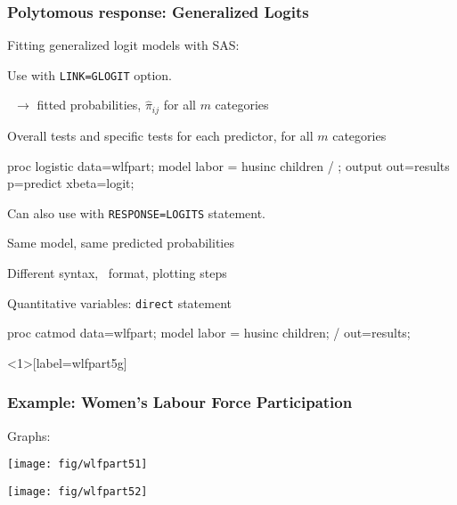 \begin{frame}[fragile]
  \frametitle{Polytomous response: Generalized Logits}
Fitting generalized logit models with SAS:
      \begin{itemize*}
	  \item Use  with \texttt{LINK=GLOGIT} option.
    	\begin{itemize*}
		\item \ODS\ $\rightarrow$ fitted probabilities, $\widehat{\pi}_{ij}$ for all $m$ categories
		\item Overall tests and specific tests for each predictor, for all $m$ categories
		\end{itemize*}
\vspace{2ex}
\begin{Input}[numbers=none]
proc logistic data=wlfpart;
   model labor = husinc children / ;
   output out=results p=predict xbeta=logit;
\end{Input}
	  \item Can also use  with \texttt{RESPONSE=LOGITS} statement.
    	\begin{itemize*}
		\item Same model, same predicted probabilities
		\item Different syntax, \ODS\ format, plotting steps
		\item Quantitative variables: \alert{\texttt{direct}} statement
		\end{itemize*}
\vspace{2ex}
\begin{Input}[numbers=none]
proc catmod data=wlfpart;
   model labor = husinc children;
    / out=results;
\end{Input}
	  \end{itemize*} 

\end{frame}

\begin{frame}<1>[label=wlfpart5g]
  \frametitle{Example: Women's Labour Force Participation}
Graphs:
 \begin{minipage}[b]{.5\linewidth}
  \centering
  \texttt{[image: fig/wlfpart51]}
 \end{minipage}%
 \begin{minipage}[b]{.5\linewidth}
  \centering
  \texttt{[image: fig/wlfpart52]}
 \end{minipage}
\end{frame}


